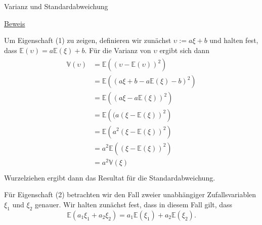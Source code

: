\documentclass[
  8pt,
  ignorenonframetext,
]{beamer}
\newcommand{\ups}{\upsilon}
\begin{document}
\begin{frame}{Varianz und Standardabweichung}
\protect\hypertarget{varianz-und-standardabweichung-8}{}
\footnotesize

\underline{Beweis} \vspace{1mm}

Um Eigenschaft (1) zu zeigen, definieren wir zunächst
\(\ups := a\xi + b\) und halten fest, dass
\(\mathbb{E}(\ups) = a\mathbb{E}(\xi) + b\). Für die Varianz von
\(\ups\) ergibt sich dann \begin{align}
\begin{split}
\mathbb{V}(\ups)
& = \mathbb{E}\left((\ups - \mathbb{E}(\ups))^2\right)      \\
& = \mathbb{E}\left((a\xi+b-a\mathbb{E}(\xi)-b)^2\right)    \\
& = \mathbb{E}\left((a\xi-a\mathbb{E}(\xi))^2\right)        \\
& = \mathbb{E}\left((a(\xi - \mathbb{E}(\xi))^2\right)      \\
& = \mathbb{E}\left(a^2(\xi - \mathbb{E}(\xi))^2\right)     \\
& = a^2\mathbb{E}\left((\xi - \mathbb{E}(\xi))^2\right)     \\
& = a^2\mathbb{V}(\xi)                                  \\
\end{split}
\end{align} Wurzelziehen ergibt dann das Resultat für die
Standardabweichung. \vspace{1mm}

Für Eigenschaft (2) betrachten wir den Fall zweier unabhängiger
Zufallsvariablen \(\xi_1\) und \(\xi_2\) genauer. Wir halten zunächst
fest, dass in diesem Fall gilt, dass \begin{equation}
\mathbb{E}\left(a_1\xi_1 + a_2\xi_2\right) = a_1\mathbb{E}(\xi_1) + a_2\mathbb{E}(\xi_2).
\end{equation}
\end{frame}
\end{document}
